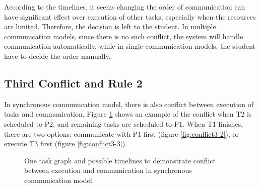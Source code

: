 \documentclass[msc,deptreport, cs]{infthesis}
\begin{document}
According to the timelines, it seems changing the order of communication can have significant effect over execution of other tasks, especially when the resources are limited. Therefore, the decision is left to the student. In multiple communication models, since there is no such conflict, the system will handle communication automatically, while in single communication models, the student have to decide the order manually.

\subsection{Third Conflict and Rule 2}

In synchronous communication model, there is also conflict between execution of tasks and communication. Figure \ref{fig:conflict3} shows an example of the conflict when T2 is scheduled to P2, and remaining tasks are scheduled to P1. When T1 finishes, there are two options: communicate with P1 first (figure \ref{fig:conflict3-2}), or execute T3 first (figure \ref{fig:conflict3-3}).

\begin{figure}[htpb]
  \centering
   \hspace{1em}
   \hspace{1em}
  \caption{One task graph and possible timelines to demonstrate conflict between execution and communication in synchronous communication model}
  \label{fig:conflict3}
\end{figure}
\end{document}
